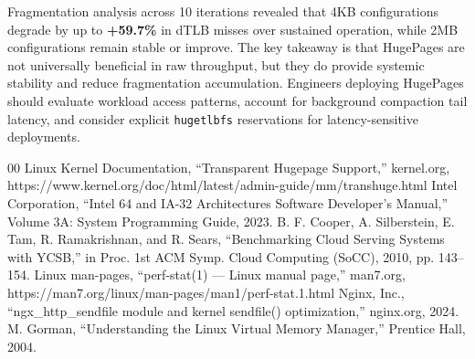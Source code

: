\documentclass[conference]{IEEEtran}
\begin{document}
Fragmentation analysis across 10 iterations revealed that 4KB configurations degrade by up to \textbf{+59.7\%} in dTLB misses over sustained operation, while 2MB configurations remain stable or improve. The key takeaway is that HugePages are not universally beneficial in raw throughput, but they do provide systemic stability and reduce fragmentation accumulation. Engineers deploying HugePages should evaluate workload access patterns, account for background compaction tail latency, and consider explicit \texttt{hugetlbfs} reservations for latency-sensitive deployments.

\begin{thebibliography}{00}
 Linux Kernel Documentation, ``Transparent Hugepage Support,'' kernel.org, https://www.kernel.org/doc/html/latest/admin-guide/mm/transhuge.html
 Intel Corporation, ``Intel 64 and IA-32 Architectures Software Developer's Manual,'' Volume 3A: System Programming Guide, 2023.
 B. F. Cooper, A. Silberstein, E. Tam, R. Ramakrishnan, and R. Sears, ``Benchmarking Cloud Serving Systems with YCSB,'' in Proc. 1st ACM Symp. Cloud Computing (SoCC), 2010, pp. 143--154.
 Linux man-pages, ``perf-stat(1) --- Linux manual page,'' man7.org, https://man7.org/linux/man-pages/man1/perf-stat.1.html
 Nginx, Inc., ``ngx\_http\_sendfile module and kernel sendfile() optimization,'' nginx.org, 2024.
 M. Gorman, ``Understanding the Linux Virtual Memory Manager,'' Prentice Hall, 2004.
\end{thebibliography}
\end{document}

